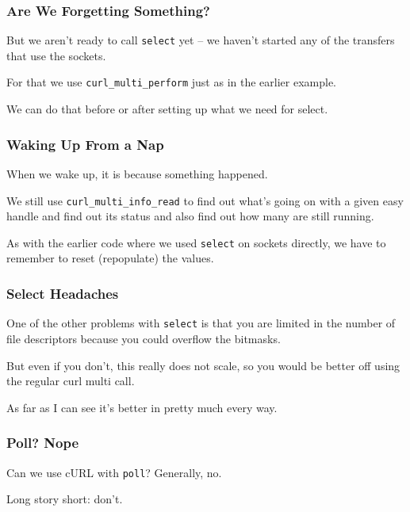\begin{frame}
\frametitle{Are We Forgetting Something?}

But we aren't ready to call \texttt{select} yet -- we haven't started any of the transfers  that use the sockets.

For that we use \texttt{curl\_multi\_perform} just as in the earlier example. 

We can do that before or after setting up what we need for select.

\end{frame}


\begin{frame}
\frametitle{Waking Up From a Nap}

When we wake up, it is because something happened. 

We still use \texttt{curl\_multi\_info\_read} to find out what's going on with a given easy handle and find out its status and also find out how many are still running.

As with the earlier code where we used \texttt{select} on sockets directly, we have to remember to reset (repopulate) the values.

\end{frame}


\begin{frame}
\frametitle{Select Headaches}

One of the other problems with \texttt{select} is that you are limited in the number of file descriptors because you could overflow the bitmasks.

But even if you don't, this really does not scale, so you would be better off using the regular curl multi call.

As far as I can see it's better in pretty much every way.

\end{frame}

\begin{frame}
\frametitle{Poll? Nope}

Can we use cURL with \texttt{poll}? Generally, no.

Long story short: don't. 

\end{frame}






